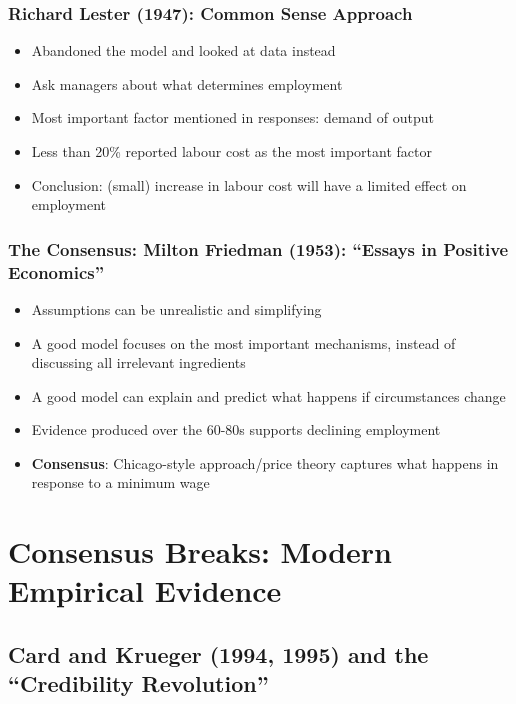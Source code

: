         \subsubsection{Richard Lester (1947): Common Sense Approach}
          \begin{itemize}
              \item Abandoned the model and looked at data instead
              \item Ask managers about what determines employment
              \item Most important factor mentioned in responses: demand of output
              \item Less than 20\% reported labour cost as the most important factor
              \item Conclusion: (small) increase in labour cost will have a limited effect on employment
          \end{itemize}
          
        \subsubsection{The Consensus: Milton Friedman (1953): “Essays in Positive Economics”}
            \begin{itemize}
                \item Assumptions can be unrealistic and simplifying
                \item A good model focuses on the most important mechanisms, instead of discussing all irrelevant ingredients
                \item A good model can explain and predict what happens if circumstances change
                \item Evidence produced over the 60-80s supports declining employment
                \item \textbf{Consensus}: Chicago-style approach/price theory captures what happens in response to a minimum wage
            \end{itemize}
    
\section{Consensus Breaks: Modern Empirical Evidence}

    \subsection{Card and Krueger (1994, 1995) and the “Credibility Revolution”}
    
